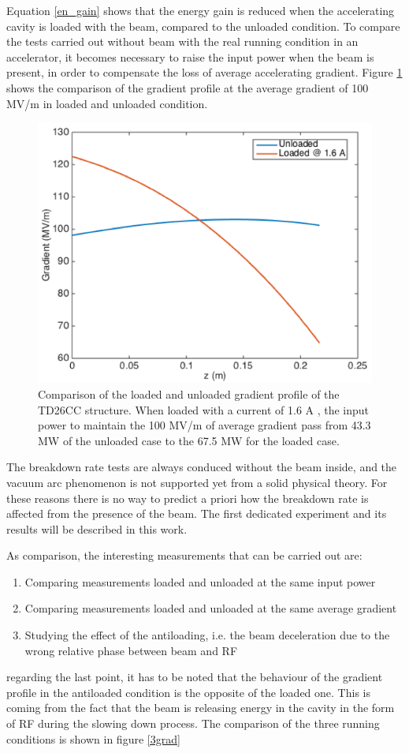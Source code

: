 Equation \ref{en_gain} shows that the energy gain is reduced when the accelerating cavity is loaded with the beam, compared to the unloaded condition. To compare the tests carried out without beam with the real running condition in an accelerator, it becomes necessary to raise the input power when the beam is present, in order to compensate the loss of average accelerating gradient. Figure \ref{100mvm} shows the comparison of the gradient profile at the average gradient of 100 MV/m in loaded and unloaded condition.

\begin{figure}[h]
\centering 
\includegraphics[scale=1]{pictures/grad_vs_IP.png}
\caption{Comparison of the loaded and unloaded gradient profile of the TD26CC structure. When loaded with a current of 1.6 A , the input power to maintain the 100 MV/m of average gradient pass from 43.3 MW of the unloaded case to the 67.5 MW for the loaded case. }
\label{100mvm}
\end{figure}

The breakdown rate tests are always conduced without the beam inside, and the vacuum arc phenomenon is not supported yet from a solid physical theory. For these reasons there is no way to predict a priori how the breakdown rate is affected from the presence of the beam. The first dedicated experiment and its results will be described in this work.

As comparison, the interesting measurements that can be carried out are:
\begin{enumerate}
\item Comparing measurements loaded and unloaded at the same input power
\item Comparing measurements loaded and unloaded at the same average gradient
\item Studying the effect of the antiloading, i.e. the beam deceleration due to the wrong relative phase between beam and RF
\end{enumerate}
regarding the last point, it has to be noted that the behaviour of the gradient profile in the antiloaded condition is the opposite of the loaded one. This is coming from the fact that the beam is releasing energy in the cavity in the form of RF during the slowing down process. The comparison of the three running conditions is shown in figure \ref{3grad}

